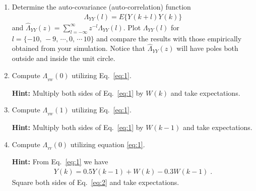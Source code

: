 \documentclass[letterpaper,12pt]{article}
\begin{document}
\begin{enumerate}
\begin{enumerate}
\item
Determine the auto-covariance (auto-correlation) function
\begin{align*}
    \Lambda_{YY}(l) = E\{Y(k+l)Y(k)\}
\end{align*}
and $\hat{\Lambda}_{YY}(z) = \sum_{l=-\infty}^{\infty} z^{-l} \Lambda_{YY}(l)$. Plot $\Lambda_{YY}(l)$ for $l = \{-10,\, -9,\, \cdots ,0,\, \cdots \,10\}$ and compare the results with those empirically obtained from your simulation. Notice that $\hat{\Lambda}_{YY}(z)$ will have poles both outside and inside the unit circle.


\item
Compute $\Lambda_{_{YW}}(0)$ utilizing Eq.~\eqref{eq:1}.

\textbf{Hint:} Multiply both sides of Eq.~\eqref{eq:1} by $W(k)$ and take expectations.

\item
Compute $\Lambda_{_{YW}}(1)$ utilizing Eq.~\eqref{eq:1}.

\textbf{Hint:} Multiply both sides of Eq.~\eqref{eq:1} by $W(k-1)$ and take expectations.


\item
Compute $\Lambda_{_{YY}}(0)$ utilizing equation \eqref{eq:1}.

\textbf{Hint:} From Eq.~\eqref{eq:1} we have
\begin{align}
    \label{eq:2}
    Y(k) =  0.5 Y(k-1)+ W(k) - 0.3 W(k-1) \; .
\end{align}
Square both sides of Eq.~\eqref{eq:2} and take expectations.

\end{enumerate}



\end{enumerate}
\end{document}
